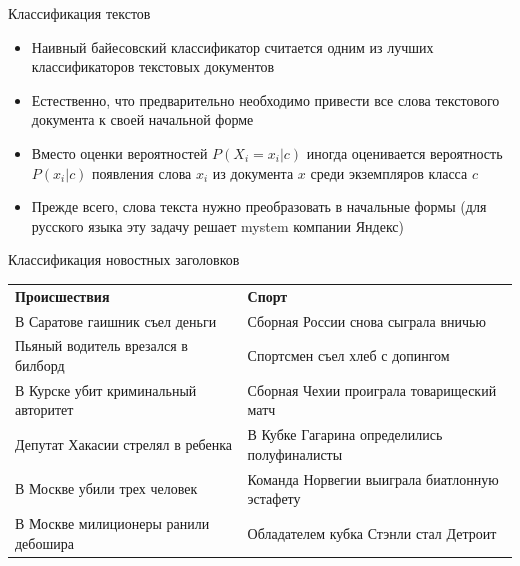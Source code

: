 \documentclass[compress,red,unicode]{beamer}
\begin{document}
\begin{frame}{}%

\begin{block}{}
\scriptsize

\end{block}
\end{frame}

\begin{frame}{Классификация текстов}
\begin{itemize}
	\item Наивный байесовский классификатор считается одним из лучших классификаторов текстовых документов
	\item Естественно, что предварительно необходимо привести все слова текстового документа к своей начальной форме
	\item Вместо оценки вероятностей $P(X_i = x_i | c)$ иногда оценивается вероятность $P(x_i|c)$ появления слова $x_i$ из документа $x$ среди экземпляров класса $c$
	\item Прежде всего, слова текста нужно преобразовать в начальные формы (для русского языка эту задачу решает mystem компании Яндекс)
\end{itemize}
\end{frame}




\begin{frame}{Классификация новостных заголовков}{}
{\footnotesize
\begin{tabular}{p{5.5cm}p{5.4cm}}
\bf\small\color{red!40!black} Происшествия & \bf\small\color{blue!40!black} Спорт \\[0.1cm]
\color{red!20!black}В Саратове гаишник съел деньги & \color{blue!20!black}Сборная России снова сыграла вничью \\
\color{red!20!black}Пьяный водитель врезался в билборд & \color{blue!20!black} Спортсмен съел хлеб с допингом\\
\color{red!20!black}В Курске убит криминальный авторитет& \color{blue!20!black} Сборная Чехии проиграла товарищеский матч\\
\color{red!20!black}Депутат Хакасии стрелял в ребенка & \color{blue!20!black} В Кубке Гагарина определились полуфиналисты\\
\color{red!20!black}В Москве убили трех человек & \color{blue!20!black} Команда Норвегии выиграла биатлонную эстафету\\
\color{red!20!black}В Москве милиционеры ранили дебошира & \color{blue!20!black} Обладателем кубка Стэнли стал Детроит \\
\end{tabular}
}

\end{frame}
\end{document}
